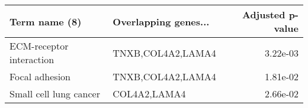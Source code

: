 \begin{tabular}{llr}
\toprule
           Term name (8) & Overlapping genes... &  Adjusted p-value \\
\midrule
ECM-receptor interaction &    TNXB,COL4A2,LAMA4 &          3.22e-03 \\
          Focal adhesion &    TNXB,COL4A2,LAMA4 &          1.81e-02 \\
  Small cell lung cancer &         COL4A2,LAMA4 &          2.66e-02 \\
\bottomrule
\end{tabular}
